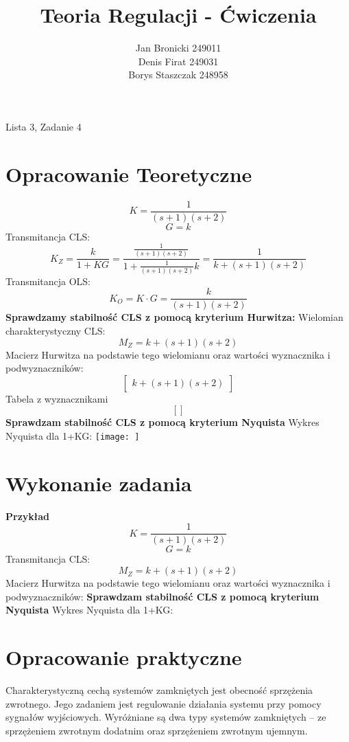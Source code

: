 \documentclass{article}
\title{Teoria Regulacji - Ćwiczenia}
\author{Jan Bronicki 249011 \\
        Denis Firat 249031  \\
        Borys Staszczak 248958 }
\date{}
\begin{document}
\maketitle
\begin{center}
    Lista 3, Zadanie 4
\end{center}

\section{Opracowanie Teoretyczne}
$$K=\frac{1}{\left(s + 1\right) \left(s + 2\right)}$$
$$G=k$$
Transmitancja CLS:
$$K_Z=\frac{k}{1+KG}=\frac{\frac{1}{\left(s + 1\right) \left(s + 2\right)}}{1+\frac{1}{\left(s + 1\right) \left(s + 2\right)}k}=\frac{1}{k + \left(s + 1\right) \left
(s + 2\right)}$$
Transmitancja OLS:
$$K_O=K\cdot G=\frac{k}{\left(s + 1\right) \left(s + 2\right)}$$
\textbf{Sprawdzamy stabilność CLS z pomocą kryterium Hurwitza:}\newline
Wielomian charakterystyczny CLS:
$$M_Z=k + \left(s + 1\right) \left(s + 2\right)$$
Macierz Hurwitza na podstawie tego wielomianu oraz wartości wyznacznika i podwyznaczników:
$$\left[\begin{matrix}k + \left(s + 1\right) \left(s + 2\right)\end{matrix}\right]$$
 Tabela z wyznacznikami
$$\left[ \right]$$
\newline\textbf{Sprawdzam stabilność CLS z pomocą kryterium Nyquista}\newline
Wykres Nyquista dla 1+KG:
\texttt{[image: ]}
\newpage
\section{Wykonanie zadania}
\textbf{Przykład }
$$K=\frac{1}{\left(s + 1\right) \left(s + 2\right)}$$
$$G=k$$
Transmitancja CLS:
$$M_Z=k + \left(s + 1\right) \left(s + 2\right)$$
Macierz Hurwitza na podstawie tego wielomianu oraz wartości wyznacznika i podwyznaczników:      
\textbf{Sprawdzam stabilność CLS z pomocą kryterium Nyquista}\newline
Wykres Nyquista dla 1+KG:
\section{Opracowanie praktyczne}

\quad Charakterystyczną cechą systemów zamkniętych jest obecność sprzężenia zwrotnego. 
Jego zadaniem jest regulowanie działania systemu przy pomocy sygnałów wyjściowych. 
Wyróżniane są dwa typy systemów zamkniętych -- ze sprzężeniem zwrotnym dodatnim oraz sprzężeniem zwrotnym ujemnym.
\end{document}
